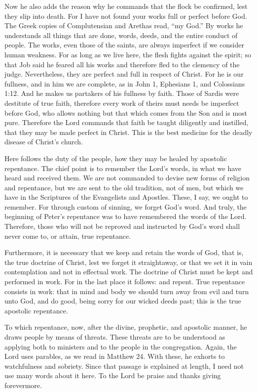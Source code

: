 Now he also adds the reason why he commands that the flock be confirmed, lest they slip into death. For I have not found your works full or perfect before God. The Greek copies of Complutensian and Arethas read, “my God.” By works he understands all things that are done, words, deeds, and the entire conduct of people. The works, even those of the saints, are always imperfect if we consider human weakness. For as long as we live here, the flesh fights against the spirit; so that Job said he feared all his works and therefore fled to the clemency of the judge. Nevertheless, they are perfect and full in respect of Christ. For he is our fullness, and in him we are complete, as in John 1, Ephesians 1, and Colossians 1:12. And he makes us partakers of his fullness by faith. Those of Sardis were destitute of true faith, therefore every work of theirs must needs be imperfect before God, who allows nothing but that which comes from the Son and is most pure. Therefore the Lord commands that faith be taught diligently and instilled, that they may be made perfect in Christ. This is the best medicine for the deadly disease of Christ’s church.

Here follows the duty of the people, how they may be healed by apostolic repentance. The chief point is to remember the Lord’s words, in what we have heard and received them. We are not commanded to devise new forms of religion and repentance, but we are sent to the old tradition, not of men, but which we have in the Scriptures of the Evangelists and Apostles. These, I say, we ought to remember. For through custom of sinning, we forget God’s word. And truly, the beginning of Peter’s repentance was to have remembered the words of the Lord. Therefore, those who will not be reproved and instructed by God’s word shall never come to, or attain, true repentance.

Furthermore, it is necessary that we keep and retain the words of God, that is, the true doctrine of Christ, lest we forget it straightaway, or that we set it in vain contemplation and not in effectual work. The doctrine of Christ must be kept and performed in work. For in the last place it follows: and repent. True repentance consists in work: that in mind and body we should turn away from evil and turn unto God, and do good, being sorry for our wicked deeds past; this is the true apostolic repentance.

To which repentance, now, after the divine, prophetic, and apostolic manner, he draws people by means of threats. These threats are to be understood as applying both to ministers and to the people in the congregation. Again, the Lord uses parables, as we read in Matthew 24. With these, he exhorts to watchfulness and sobriety. Since that passage is explained at length, I need not use many words about it here. To the Lord be praise and thanks giving forevermore.
